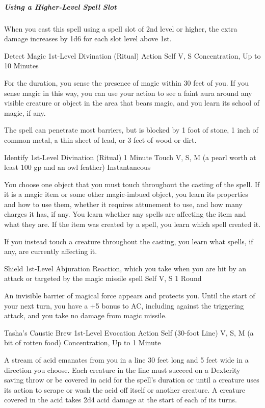 \documentclass[letterpaper,openany,oneside,twocolumn]{book}
\begin{document}
\subparagraph*{Using a Higher-Level Spell Slot} When you cast this spell using a spell slot of 2nd level or higher, the extra damage increases by 1d6 for each slot level above 1st.

\DndSpellHeader
  {Detect Magic}
  {1st-Level Divination (Ritual)}
  {Action}
  {Self}
  {V, S}
  {Concentration, Up to 10 Minutes}

For the duration, you sense the presence of magic within 30 feet of you. If you sense magic in this way, you can use your action to see a faint aura around any visible creature or object in the area that bears magic, and you learn its school of magic, if any.

The spell can penetrate most barriers, but is blocked by 1 foot of stone, 1 inch of common metal, a thin sheet of lead, or 3 feet of wood or dirt.

\DndSpellHeader
  {Identify}
  {1st-Level Divination (Ritual)}
  {1 Minute}
  {Touch}
  {V, S, M (a pearl worth at least 100 gp and an owl feather)}
  {Instantaneous}

You choose one object that you must touch throughout the casting of the spell. If it is a magic item or some other magic-imbued object, you learn its properties and how to use them, whether it requires attunement to use, and how many charges it has, if any. You learn whether any spells are affecting the item and what they are. If the item was created by a spell, you learn which spell created it.

If you instead touch a creature throughout the casting, you learn what spells, if any, are currently affecting it.

\DndSpellHeader
  {Shield}
  {1st-Level Abjuration}
  {Reaction, which you take when you are hit by an attack or targeted by the magic missile spell}
  {Self}
  {V, S}
  {1 Round}

An invisible barrier of magical force appears and protects you. Until the start of your next turn, you have a +5 bonus to AC, including against the triggering attack, and you take no damage from magic missile.

\DndSpellHeader
  {Tasha's Caustic Brew}
  {1st-Level Evocation}
  {Action}
  {Self (30-foot Line)}
  {V, S, M (a bit of rotten food)}
  {Concentration, Up to 1 Minute}

A stream of acid emanates from you in a line 30 feet long and 5 feet wide in a direction you choose. Each creature in the line must succeed on a Dexterity saving throw or be covered in acid for the spell's duration or until a creature uses its action to scrape or wash the acid off itself or another creature. A creature covered in the acid takes 2d4 acid damage at the start of each of its turns.
\end{document}
